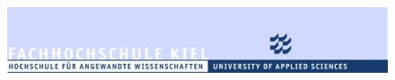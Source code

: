 


\pagestyle{empty}

\begin{figure}[H]
\vspace*{-2.5cm}
\hspace*{2.5cm}
\includegraphics[keepaspectratio, width=1.31\textwidth, right]{TemplateElements/Fachhochschule_Kiel-logo.svg.png}
\end{figure}



